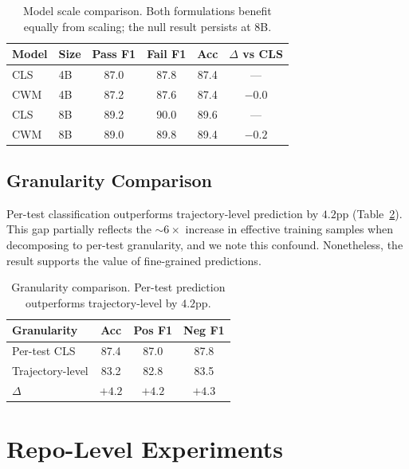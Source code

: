 \documentclass[11pt,a4paper]{article}
\begin{document}
\begin{table}[t]
\centering
\small
\caption{Model scale comparison. Both formulations benefit equally from scaling; the null result persists at 8B.}
\label{tab:scale}
\begin{tabular}{llcccc}
\toprule
\textbf{Model} & \textbf{Size} & \textbf{Pass F1} & \textbf{Fail F1} & \textbf{Acc} & \textbf{$\Delta$ vs CLS} \\
\midrule
CLS & 4B & 87.0 & 87.8 & 87.4 & --- \\
CWM & 4B & 87.2 & 87.6 & 87.4 & $-0.0$ \\
CLS & 8B & 89.2 & 90.0 & 89.6 & --- \\
CWM & 8B & 89.0 & 89.8 & 89.4 & $-0.2$ \\
\bottomrule
\end{tabular}
\end{table}

\subsection{Granularity Comparison}

Per-test classification outperforms trajectory-level prediction by $4.2$pp (Table~\ref{tab:granularity}). This gap partially reflects the ${\sim}6{\times}$ increase in effective training samples when decomposing to per-test granularity, and we note this confound. Nonetheless, the result supports the value of fine-grained predictions.

\begin{table}[t]
\centering
\small
\caption{Granularity comparison. Per-test prediction outperforms trajectory-level by $4.2$pp.}
\label{tab:granularity}
\begin{tabular}{lccc}
\toprule
\textbf{Granularity} & \textbf{Acc} & \textbf{Pos F1} & \textbf{Neg F1} \\
\midrule
Per-test CLS & 87.4 & 87.0 & 87.8 \\
Trajectory-level & 83.2 & 82.8 & 83.5 \\
$\Delta$ & $+4.2$ & $+4.2$ & $+4.3$ \\
\bottomrule
\end{tabular}
\end{table}

\section{Repo-Level Experiments}
\label{sec:repo_level}
\end{document}
